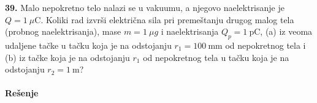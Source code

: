 \textbf{\Large 39.} Malo nepokretno telo nalazi se u vakuumu, a njegovo naelektrisanje je $Q = 1\ \mu\mathrm C$. Koliki rad izvr\v{s}i elektri\v{c}na sila pri preme\v{s}tanju drugog malog tela (probnog naelektrisanja), mase $m = 1\ \mu g$ i naelektrisanja $Q_p = 1\ \mathrm{pC}$, (a) iz veoma udaljene ta\v{c}ke u ta\v{c}ku koja je na odstojanju $r_1 = 100\ \mathrm{mm}$ od nepokretnog tela i (b) iz ta\v{c}ke koja je na odstojanju $r_1$ od nepokretnog tela u ta\v{c}ku koja je na odstojanju $r_2 = 1\ \mathrm m$?
\\\\
\textbf{\Large Re\v{s}enje}\\
